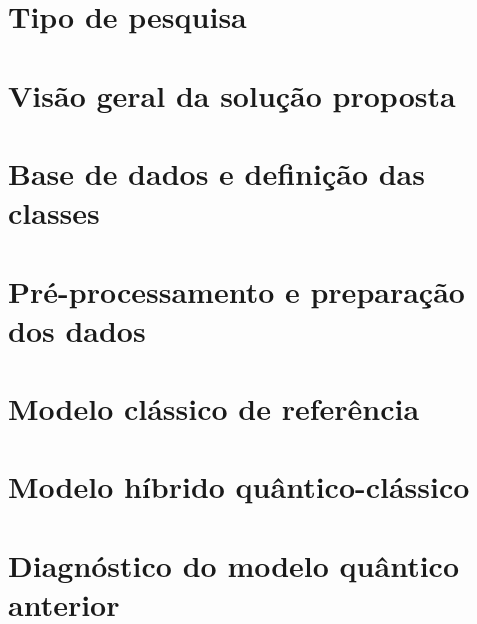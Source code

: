 \documentclass[
    12pt,
    openright,
    oneside,
    a4paper,
    english,
    brazil
]{abntex2}
\begin{document}
\section{Tipo de pesquisa}


\section{Visão geral da solução proposta}


\section{Base de dados e definição das classes}


\section{Pré-processamento e preparação dos dados}


\section{Modelo clássico de referência}


\section{Modelo híbrido quântico-clássico}


\section{Diagnóstico do modelo quântico anterior}
\end{document}
